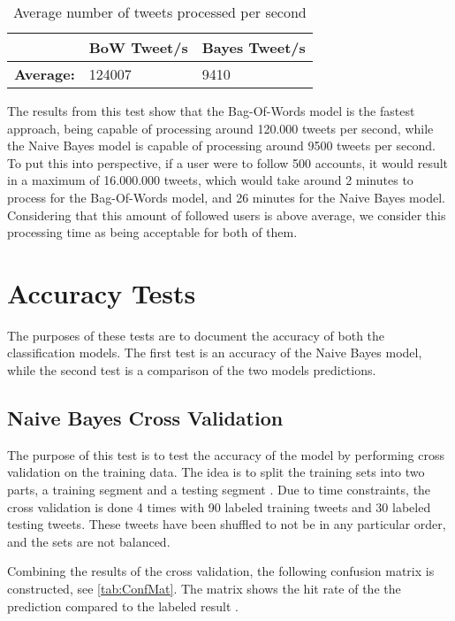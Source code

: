 \begin{table}[H]\centering
\begin{tabular}{|l|l|l|}\hline
					&	\textbf{BoW Tweet/s}	&	\textbf{Bayes Tweet/s}	\\\hline
\textbf{Average:}	&	124007				&	9410 					\\\hline	
\end{tabular}
\caption{Average number of tweets processed per second}
\label{AvgTweetsPs}
\end{table}

The results from this test show that the Bag-Of-Words model is the fastest
approach, being capable of processing around 120.000 tweets per second, while
the Naive Bayes model is capable of processing around 9500 tweets per second.
To put this into perspective, if a user were to follow 500 accounts, it would
result in a maximum of 16.000.000 tweets, which would take around 2 minutes to
process for the Bag-Of-Words model, and 26 minutes for the Naive Bayes model.
Considering that this amount of followed users is above average, we consider
this processing time as being acceptable for both of them.

\section{Accuracy Tests}
The purposes of these tests are to document the accuracy of both the
classification models. The first test is an accuracy of the Naive Bayes model,
while the second test is a comparison of the two models predictions.


\subsection{Naive Bayes Cross Validation}\label{subsec:NBCV}
The purpose of this test is to test the accuracy of the model by performing
cross validation on the training data. The idea is to split the training sets into two
parts, a training segment and a testing segment \citep[Ch. 7.5.2]{MIBook}. Due
to time constraints, the cross validation is done 4 times with 90 labeled
training tweets and 30 labeled testing tweets. These tweets have been shuffled
to not be in any particular order, and the sets are not balanced.\nl

Combining the results of the cross validation, the following confusion
matrix is constructed, see \autoref{tab:ConfMat}. The matrix shows the
hit rate of the the prediction compared to the labeled result
\citep{ConfusionMatrix}.

